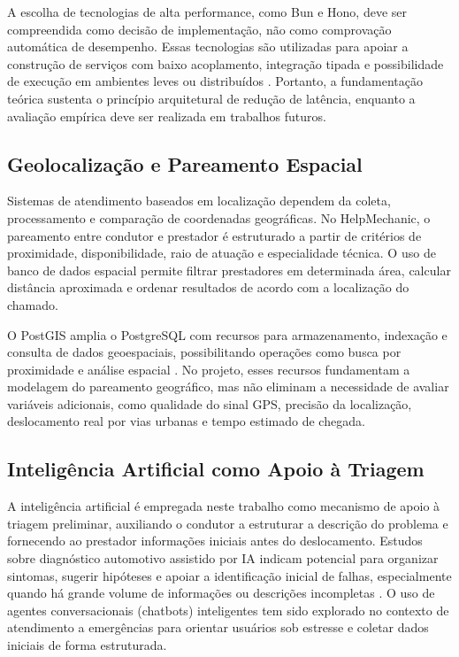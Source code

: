 \documentclass[12pt, a4paper]{article}
\begin{document}
A escolha de tecnologias de alta performance, como Bun e Hono, deve ser compreendida como decisão de implementação, não como comprovação automática de desempenho. Essas tecnologias são utilizadas para apoiar a construção de serviços com baixo acoplamento, integração tipada e possibilidade de execução em ambientes leves ou distribuídos \cite{bun_sd, honoteam_sd}. Portanto, a fundamentação teórica sustenta o princípio arquitetural de redução de latência, enquanto a avaliação empírica deve ser realizada em trabalhos futuros.

\subsection{Geolocalização e Pareamento Espacial}
Sistemas de atendimento baseados em localização dependem da coleta, processamento e comparação de coordenadas geográficas. No HelpMechanic, o pareamento entre condutor e prestador é estruturado a partir de critérios de proximidade, disponibilidade, raio de atuação e especialidade técnica. O uso de banco de dados espacial permite filtrar prestadores em determinada área, calcular distância aproximada e ordenar resultados de acordo com a localização do chamado.

O PostGIS amplia o PostgreSQL com recursos para armazenamento, indexação e consulta de dados geoespaciais, possibilitando operações como busca por proximidade e análise espacial \cite{postgis_sd}. No projeto, esses recursos fundamentam a modelagem do pareamento geográfico, mas não eliminam a necessidade de avaliar variáveis adicionais, como qualidade do sinal GPS, precisão da localização, deslocamento real por vias urbanas e tempo estimado de chegada.

\subsection{Inteligência Artificial como Apoio à Triagem}
A inteligência artificial é empregada neste trabalho como mecanismo de apoio à triagem preliminar, auxiliando o condutor a estruturar a descrição do problema e fornecendo ao prestador informações iniciais antes do deslocamento. Estudos sobre diagnóstico automotivo assistido por IA indicam potencial para organizar sintomas, sugerir hipóteses e apoiar a identificação inicial de falhas, especialmente quando há grande volume de informações ou descrições incompletas \cite{sasikala2024}. O uso de agentes conversacionais (chatbots) inteligentes tem sido explorado no contexto de atendimento a emergências para orientar usuários sob estresse e coletar dados iniciais de forma estruturada.
\end{document}
